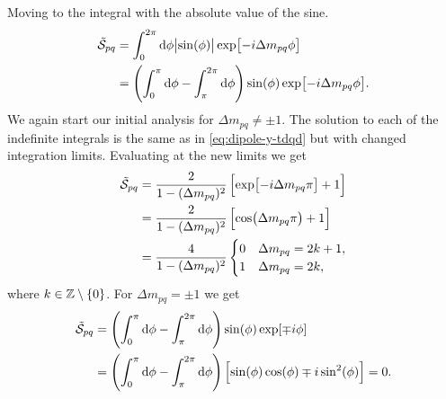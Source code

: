         Moving to the integral with the absolute value of the sine.
        \begin{align}
            \tilde{\mathcal{S}}_{pq}
            &= \int_{0}^{2\pi} \dd \phi
            \abs{\sin(\phi)}
            \exp[-i\Delta m_{pq} \phi]
            \\
            &= \left( 
                \int_{0}^{\pi} \dd \phi
                - \int_{\pi}^{2\pi} \dd \phi
             \right)
            \sin(\phi) \exp[-i\Delta m_{pq} \phi].
        \end{align}
        We again start our initial analysis for $\Delta m_{pq} \neq \pm 1$.
        The solution to each of the indefinite integrals is the same as in
        \autoref{eq:dipole-y-tdqd} but with changed integration limits.
        Evaluating at the new limits we get
        \begin{align}
            \tilde{\mathcal{S}}_{pq}
            &=
            \frac{2}{1 - (\Delta m_{pq})^2}
            \left[ 
                \exp[-i\Delta m_{pq} \pi]
                + 1
             \right]
            \\
            &= \frac{2}{1 - (\Delta m_{pq})^2}
            \left[ 
                \cos(\Delta m_{pq} \pi)
                + 1
             \right]
            \\
            &=
            \frac{4}{1 - (\Delta m_{pq})^2}
            \begin{cases}
                0 & \Delta m_{pq} = 2k + 1, \\
                1 & \Delta m_{pq} = 2k,
            \end{cases}
        \end{align}
        where $k \in \mathbb{Z} \setminus \left\{ 0 \right\}$.
        For $\Delta m_{pq} = \pm 1$ we get
        \begin{align}
            \tilde{\mathcal{S}}_{pq}
            &= \left( 
                \int_{0}^{\pi} \dd \phi
                - \int_{\pi}^{2\pi} \dd \phi
             \right)
            \sin(\phi) \exp[\mp i \phi]
            \\
            &= \left( 
                \int_{0}^{\pi} \dd \phi
                - \int_{\pi}^{2\pi} \dd \phi
             \right)
            \left[ 
                \sin(\phi)\cos(\phi)
                \mp i\sin^2(\phi)
             \right]
            = 0.
        \end{align}

